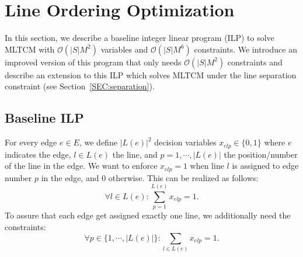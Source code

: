 \documentclass{llncs}
\begin{document}
%
\section{Line Ordering Optimization}\label{SEC:ordering}
%

In this section, we describe a baseline integer linear program (ILP) to solve MLTCM with $\mathcal{O}(|S|M^{2})$ variables and $\mathcal{O}(|S|M^{6})$ constraints.
We introduce an improved version of this program that only needs $\mathcal{O}(|S|M^2)$ constraints and describe an extension to this ILP which solves MLTCM under the line separation constraint (see Section~\ref{SEC:separation}).

%
\subsection{Baseline ILP}\label{SEC:baseline}
%
For every edge $e \in E$, we define $|L(e)|^{2}$ decision variables $x_{elp} \in \{0,1\}$ where $e$ indicates the edge, $l \in L(e)$ the line, and $p=1, \cdots, |L(e)|$ the position/number of the line in the edge. We want to enforce $x_{elp}=1$ when line $l$ is assigned to edge number $p$ in the edge, and $0$ otherwise. This can be realized as follows:
\begin{equation*}
\forall l \in L(e): \sum_{p=1}^{L(e)} x_{elp}=1.
\end{equation*}
To assure that each edge get assigned exactly one line, we additionally need the constraints:
\begin{equation*}
	\forall p \in  \{1,\cdots,|L(e)|\} : \sum_{l \in L(e)} x_{elp} = 1.
\end{equation*}
\end{document}
